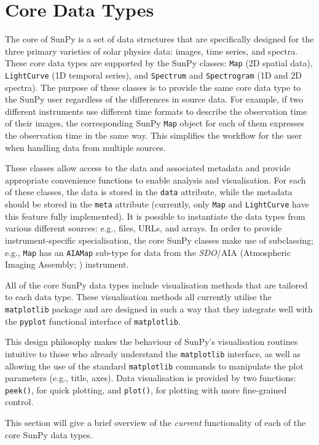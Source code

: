 \section{Core Data Types}\label{sec:DataTypes}

The core of SunPy is a set of data structures that are specifically
designed for the three primary varieties of solar physics data:
images, time series, and spectra. These core data types are supported
by the SunPy classes: \texttt{Map} (2D spatial data),
\texttt{LightCurve} (1D temporal series), and \texttt{Spectrum} and
\texttt{Spectrogram} (1D and 2D spectra).  The purpose of these
classes is to provide the same core data type to the SunPy user
regardless of the differences in source data.  For example, if two
different instruments use different time formats to describe the
observation time of their images, the corresponding SunPy \texttt{Map}
object for each of them expresses the observation time in the same
way.  This simplifies the workflow for the user when handling data
from multiple sources.

These classes allow access to the data
and associated metadata and provide appropriate convenience functions to
enable analysis and visualisation. For each of these classes, the data is
stored in the \texttt{data} attribute, while the metadata should be stored 
in the \texttt{meta} attribute (currently, only \texttt{Map} and \texttt{LightCurve} have this feature 
fully implemented). 
It is possible to instantiate the
data types from various
different sources: e.g., files, URLs, and arrays.  
In order to provide instrument-specific specialisation, the core SunPy classes 
make use of subclassing; e.g., \texttt{Map} has an \texttt{AIAMap} 
sub-type for data from the \textit{SDO}/AIA (Atmospheric Imaging Assembly; \citealt{lemen2012}) instrument. 

All of the core SunPy data types 
include visualisation methods that are tailored to each data type. 
These visualisation methods all currently utilise the \texttt{matplotlib} 
package and are designed in such a way that they integrate well with 
the \texttt{pyplot} functional interface of \texttt{matplotlib}.

This design philosophy makes the behaviour of SunPy's visualisation 
routines intuitive to those who already understand the \texttt{matplotlib}
interface, as well as allowing the use of the standard 
\texttt{matplotlib} commands to manipulate the plot parameters (e.g., title, axes).
Data visualisation is provided by two functions: \texttt{peek()}, for quick 
plotting, and \texttt{plot()}, for plotting with more fine-grained control.

This section will give a brief overview of the \textit{current} functionality 
of each of the core SunPy data types.




